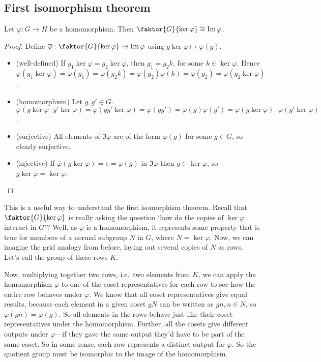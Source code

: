 \subsection{First isomorphism theorem}
\begin{theorem}
	Let \(\varphi: G \to H\) be a homomorphism.
	Then \(\faktor{G}{\ker \varphi} \cong \Im \varphi\).
\end{theorem}
\begin{proof}
	Define \(\overline \varphi: \faktor{G}{\ker \varphi} \to \Im \varphi\) using \(g \ker \varphi \mapsto \varphi(g)\).
	\begin{itemize}
		\item (well-defined) If \(g_1 \ker \varphi = g_2 \ker \varphi\), then \(g_1 = g_2k\), for some \(k \in \ker \varphi\).
		      Hence \(\overline\varphi(g_1 \ker \varphi) = \varphi(g_1) = \varphi(g_2k) = \varphi(g_2)\varphi(k) = \varphi(g_2) = \overline\varphi(g_2 \ker \varphi)\).
		\item (homomorphism) Let \(g, g' \in G\).
		      \(\overline\varphi(g \ker \varphi \cdot g' \ker \varphi) = \overline\varphi(gg' \ker \varphi) = \varphi(gg') = \varphi(g)\varphi(g') = \overline\varphi(g\ker\varphi) \cdot \overline\varphi(g'\ker\varphi)\).
		\item (surjective) All elements of \(\Im \varphi\) are of the form \(\varphi(g)\) for some \(g \in G\), so clearly surjective.
		\item (injective) If \(\overline\varphi(g \ker \varphi) = e = \varphi(g)\) in \(\Im \varphi\) then \(g \in \ker \varphi\), so \(g \ker \varphi = \ker \varphi\).
	\end{itemize}
\end{proof}
This is a useful way to understand the first isomorphism theorem.
Recall that \(\faktor{G}{\ker \varphi}\) is really asking the question `how do the copies of \(\ker \varphi\) interact in \(G\)'?
Well, as \(\varphi\) is a homomorphism, it represents some property that is true for members of a normal subgroup \(N\) in \(G\), where \(N = \ker \varphi\).
Now, we can imagine the grid analogy from before, laying out several copies of \(N\) as rows.
Let's call the group of these rows \(K\).

Now, multiplying together two rows, i.e.\ two elements from \(K\), we can apply the homomorphism \(\varphi\) to one of the coset representatives for each row to see how the entire row behaves under \(\varphi\).
We know that all coset representatives give equal results, because each element in a given coset \(gN\) can be written as \(gn, n \in N\), so \(\varphi(gn) = \varphi(g)\).
So all elements in the rows behave just like their coset representatives under the homomorphism.
Further, all the cosets give different outputs under \(\varphi\)---if they gave the same output they'd have to be part of the same coset.
So in some sense, each row represents a distinct output for \(\varphi\).
So the quotient group must be isomorphic to the image of the homomorphism.

